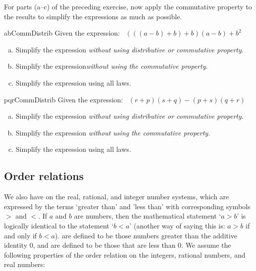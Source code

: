 \begin{exercise}{}
For parts (a--c) of the preceding exercise, now apply the commutative property to the results to simplify the expressions as much as possible.
\end{exercise}

\begin{exercise}{abCommDistrib}
Given the expression:~
 $(((a-b)+b)+b)(a-b) + b^2$
\begin{enumerate}[(a)]
\item
Simplify the expression \emph{without using distributive or commutative property}.
\item
Simplify the expression\emph{without using the commutative property}.
\item
Simplify the expression using all laws.
\end{enumerate}
\end{exercise}

\begin{exercise}{pqrCommDistrib}
Given the expression:~
 $(r+p)(s+q) - (p+s)(q+r)$
\begin{enumerate}[(a)]
\item
Simplify the expression \emph{without using distributive or commutative property}.
\item
Simplify the expression \emph{without using the commutative property}.
\item
Simplify the expression using all laws.
\end{enumerate}
\end{exercise}



\subsection{Order relations}\label{subsec:orderprop}
We also have  on the real, rational, and integer number systems, which are expressed by the terms `greater than'  and 'less than' with corresponding symbols $>$ and $<$. If $a$ and $b$ are numbers, then  the mathematical statement `$a > b$' is logically identical to the statement  `$b<a$' (another way of saying this is: $a > b$ if and only if $b < a$).  are defined to be those numbers greater than the additive identity 0, and  are defined to be those that  are less than 0. We assume the following properties of the order relation on the integers, rational numbers, and real numbers:

